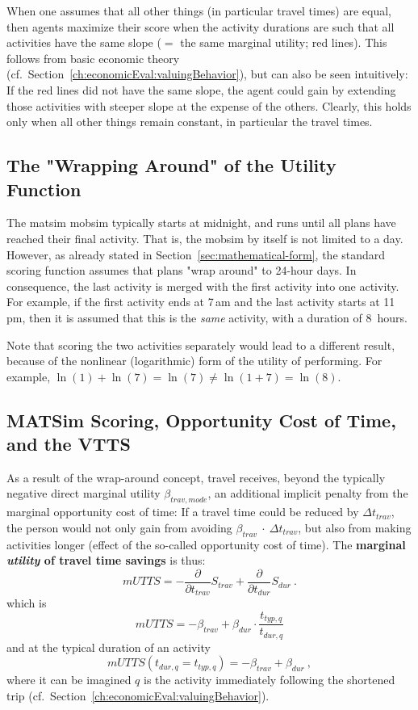 When one assumes that all other things (in particular travel times) are equal, then agents maximize their score when the activity durations are such that all activities have the same slope ($=$ the same marginal utility; red lines).  This follows from basic economic theory (cf.~Section~\ref{ch:economicEval:valuingBehavior}), but can also be seen intuitively: If the red lines did not have the same slope, the agent could gain by extending those activities with steeper slope at the expense of the others.  Clearly, this holds only when all other things remain constant, in particular the travel times.

\subsection{The "Wrapping Around" of the Utility Function}
\label{sec:wrap-around}
The \gls{matsim} \gls{mobsim} typically starts at midnight, and runs until all plans have reached their final activity.  That is, the \gls{mobsim} by itself is not limited to a day.  However, as already stated in Section~\ref{sec:mathematical-form}, the standard scoring function assumes that plans "wrap around" to 24-hour days.  In consequence, the last activity is merged with the first activity into one activity. For example, if the first activity ends at 7\,am and the last activity starts at 11\,pm, then it is assumed that this is the \emph{same} activity, with a duration of 8~hours.

Note that scoring the two activities separately would lead to a different result, because of the nonlinear (logarithmic) form of the utility of performing. For example, $\ln(1) + \ln(7) = \ln(7) \ne \ln(1 + 7) = \ln(8)$.

\subsection{MATSim Scoring, Opportunity Cost of Time, and the VTTS}
\label{sec:opport-cost-of-time}
As a result of the wrap-around concept, travel receives, beyond the typically negative direct marginal utility $\beta_{trav, mode}$, an additional implicit penalty from the marginal opportunity cost of time: If a travel time could be reduced by $\Delta t_{trav}$, the person would not only gain from avoiding $\beta_{trav}~\cdot~\Delta t_{trav}$, but also from making activities longer (effect of the so-called opportunity cost of time). The \textbf{marginal \emph{utility} of travel time savings} is thus:
%
\[
mUTTS = - \frac{\partial}{\partial t_{trav}} S_{trav} + \frac{\partial}{\partial t_{dur}}S_{dur} \ .
\]
which is
\begin{equation}
mUTTS = - \beta_{trav}
+  \beta_{dur} \cdot \frac{t_{typ,q}}{t_{dur,q}} 
\label{eq:mUTTSfull}
\end{equation}
and at the typical duration of an activity
\[
mUTTS(t_{dur,q} = t_{typ,q}) = - \beta_{trav} + \beta_{dur} \ , 
\]
where it can be imagined $q$ is the activity immediately following the shortened trip (cf.~Section~\ref{ch:economicEval:valuingBehavior}).

